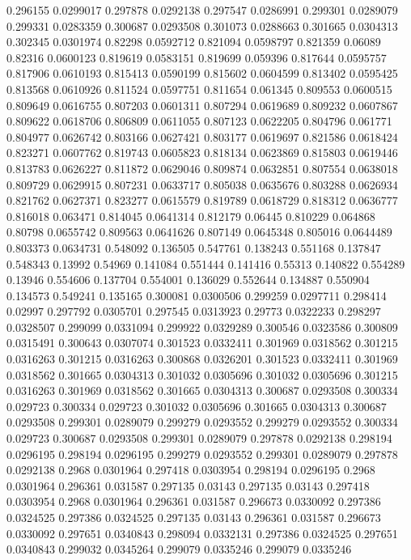0.296155 0.0299017
0.297878 0.0292138
0.297547 0.0286991
0.299301 0.0289079
0.299331 0.0283359
0.300687 0.0293508
0.301073 0.0288663
0.301665 0.0304313
0.302345 0.0301974
0.82298 0.0592712
0.821094 0.0598797
0.821359 0.06089
0.82316 0.0600123
0.819619 0.0583151
0.819699 0.059396
0.817644 0.0595757
0.817906 0.0610193
0.815413 0.0590199
0.815602 0.0604599
0.813402 0.0595425
0.813568 0.0610926
0.811524 0.0597751
0.811654 0.061345
0.809553 0.0600515
0.809649 0.0616755
0.807203 0.0601311
0.807294 0.0619689
0.809232 0.0607867
0.809622 0.0618706
0.806809 0.0611055
0.807123 0.0622205
0.804796 0.061771
0.804977 0.0626742
0.803166 0.0627421
0.803177 0.0619697
0.821586 0.0618424
0.823271 0.0607762
0.819743 0.0605823
0.818134 0.0623869
0.815803 0.0619446
0.813783 0.0626227
0.811872 0.0629046
0.809874 0.0632851
0.807554 0.0638018
0.809729 0.0629915
0.807231 0.0633717
0.805038 0.0635676
0.803288 0.0626934
0.821762 0.0627371
0.823277 0.0615579
0.819789 0.0618729
0.818312 0.0636777
0.816018 0.063471
0.814045 0.0641314
0.812179 0.06445
0.810229 0.064868
0.80798 0.0655742
0.809563 0.0641626
0.807149 0.0645348
0.805016 0.0644489
0.803373 0.0634731
0.548092 0.136505
0.547761 0.138243
0.551168 0.137847
0.548343 0.13992
0.54969 0.141084
0.551444 0.141416
0.55313 0.140822
0.554289 0.13946
0.554606 0.137704
0.554001 0.136029
0.552644 0.134887
0.550904 0.134573
0.549241 0.135165
0.300081 0.0300506
0.299259 0.0297711
0.298414 0.02997
0.297792 0.0305701
0.297545 0.0313923
0.29773 0.0322233
0.298297 0.0328507
0.299099 0.0331094
0.299922 0.0329289
0.300546 0.0323586
0.300809 0.0315491
0.300643 0.0307074
0.301523 0.0332411
0.301969 0.0318562
0.301215 0.0316263
0.301215 0.0316263
0.300868 0.0326201
0.301523 0.0332411
0.301969 0.0318562
0.301665 0.0304313
0.301032 0.0305696
0.301032 0.0305696
0.301215 0.0316263
0.301969 0.0318562
0.301665 0.0304313
0.300687 0.0293508
0.300334 0.029723
0.300334 0.029723
0.301032 0.0305696
0.301665 0.0304313
0.300687 0.0293508
0.299301 0.0289079
0.299279 0.0293552
0.299279 0.0293552
0.300334 0.029723
0.300687 0.0293508
0.299301 0.0289079
0.297878 0.0292138
0.298194 0.0296195
0.298194 0.0296195
0.299279 0.0293552
0.299301 0.0289079
0.297878 0.0292138
0.2968 0.0301964
0.297418 0.0303954
0.298194 0.0296195
0.2968 0.0301964
0.296361 0.031587
0.297135 0.03143
0.297135 0.03143
0.297418 0.0303954
0.2968 0.0301964
0.296361 0.031587
0.296673 0.0330092
0.297386 0.0324525
0.297386 0.0324525
0.297135 0.03143
0.296361 0.031587
0.296673 0.0330092
0.297651 0.0340843
0.298094 0.0332131
0.297386 0.0324525
0.297651 0.0340843
0.299032 0.0345264
0.299079 0.0335246
0.299079 0.0335246
